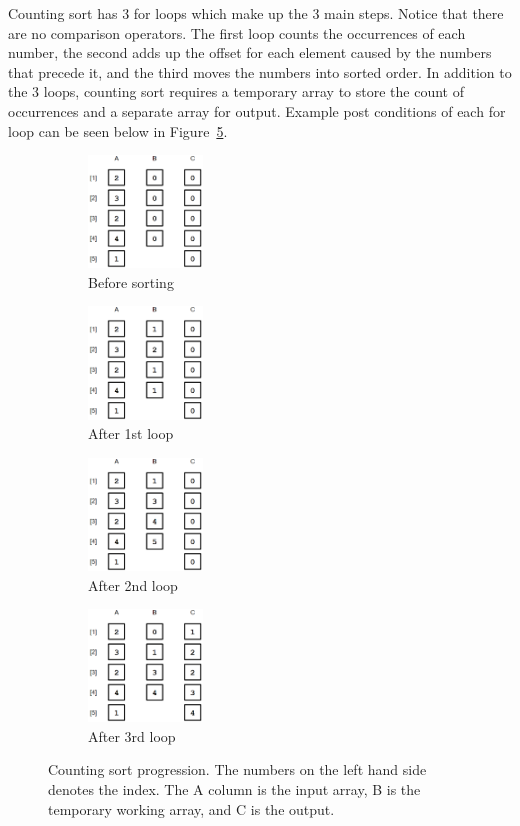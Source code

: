 \documentclass[12pt]{article}
\begin{document}
	Counting sort has 3 for loops which make up the 3 main steps. 
	Notice that there are no comparison operators.
	The first loop counts the occurrences of each number, the second adds up the offset for each element caused by the numbers that precede it, and the third moves the numbers into sorted order.
	In addition to the 3 loops, counting sort requires a temporary array to store the count of occurrences and a separate array for output.
	Example post conditions of each for loop can be seen below in Figure~\ref{fig:countmerge}.
	\begin{figure}[H]
		
		\begin{subfigure}{0.24\textwidth}
			\includegraphics[width=1.2in]{_0000_count0.png} 
			\caption{Before sorting}
			\label{fig:count1}
		\end{subfigure}
		\begin{subfigure}{0.24\textwidth}
			\includegraphics[width=1.2in]{_0002_count2.png}
			\caption{After 1st loop}
			\label{fig:count2}
		\end{subfigure}
		\begin{subfigure}{0.24\textwidth}
			\includegraphics[width=1.2in]{_0001_count1.png}
			\caption{After 2nd loop}
			\label{fig:count3}
		\end{subfigure}
		\begin{subfigure}{0.24\textwidth}
			\includegraphics[width=1.2in]{_0003_count3.png}
			\caption{After 3rd loop}
			\label{fig:count4}
		\end{subfigure}

		\caption{Counting sort progression. The numbers on the left hand side denotes the index. The A column is the input array, B is the temporary working array, and C is the output.}
		\label{fig:countmerge}
	\end{figure}
	
\end{document}
